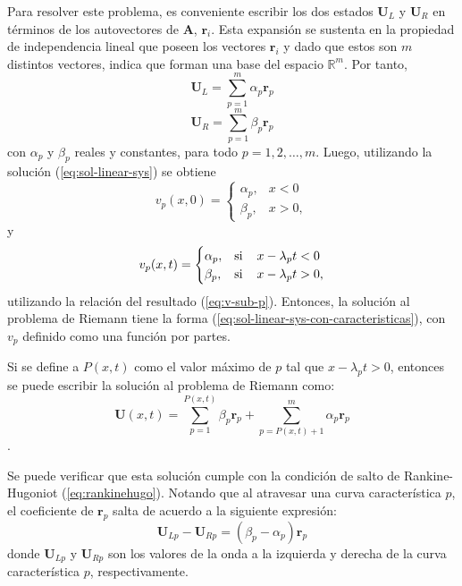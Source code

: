 Para resolver este problema, es conveniente escribir los dos estados $\mathbf{U}_L$ y  $\mathbf{U}_R$ en términos de los autovectores de $\mathbf{A}$, $\mathbf{r}_i$. Esta expansión se sustenta en la propiedad de independencia lineal que poseen los vectores $\mathbf{r}_i$ y dado que estos son $m$ distintos vectores,  indica que forman una base del espacio $\mathbb{R}^{m}$. Por tanto,
\begin{equation}
	\mathbf{U}_L = \sum_{p=1}^{m} \alpha_{p} \mathbf{r}_{p}
	\label{eq:ul-sol-numeric}
\end{equation}
\begin{equation}
	\mathbf{U}_R = \sum_{p=1}^{m} \beta_{p} \mathbf{r}_{p}
		\label{eq:ur-sol-numeric}
\end{equation}
con $\alpha_p$ y $\beta_{p}$ reales y constantes, para todo $p=1,2,\dots, m$.
Luego, utilizando la solución (\ref{eq:sol-linear-sys}) se obtiene
\begin{equation}
	v_p(x,0) = 
	\begin{cases}
		\alpha_p, & x < 0 \\
		\beta_{p}, & x > 0,
	\end{cases}
\end{equation}
y
\begin{equation}
	v_p(x,t) = 
	\begin{cases}
		\alpha_p, & \text{si} \hspace{4mm} x - \lambda_{p} t < 0 \\
		\beta_{p}, & \text{si} \hspace{4mm} x - \lambda_{p} t > 0,
	\end{cases}
\end{equation}
utilizando la relación del resultado (\ref{eq:v-sub-p}). Entonces, la solución al problema de Riemann tiene la forma (\ref{eq:sol-linear-sys-con-caracteristicas}), con $v_p$ definido como una función por partes.

Si se define a $P(x,t)$ como el valor máximo de $p$ tal que $x - \lambda_{p} t > 0$, entonces se puede escribir la solución al problema de Riemann como:
\begin{equation}
	\mathbf{U}(x,t) = \sum_{p=1}^{P(x,t)}\beta_{p}\mathbf{r}_{p} + \sum_{p=P(x,t) +1}^{m} \alpha_{p} \mathbf{r}_p
	\label{eq:sol-riemann-linear-sys-1}
\end{equation}.

Se puede verificar que esta solución cumple con la condición de salto de Rankine-Hugoniot (\ref{eq:rankinehugo}). Notando que al atravesar una curva característica $p$, el coeficiente de $\mathbf{r}_p$ salta de acuerdo a la siguiente expresión:
\begin{equation}
	\mathbf{U}_{Lp} - \mathbf{U}_{Rp} = (\beta_{p} - \alpha_{p})\mathbf{r}_p
\end{equation}
donde $\mathbf{U}_{Lp}$ y $\mathbf{U}_{Rp}$ son los valores de la onda a la izquierda y derecha de la curva característica $p$, respectivamente.

